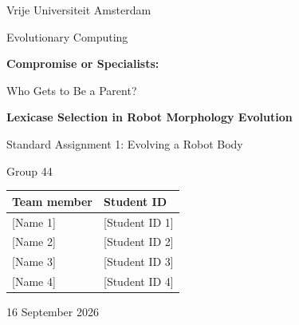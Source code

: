 \onecolumn
\thispagestyle{empty}
\begin{center}
\vspace*{1.0cm}
{\Large Vrije Universiteit Amsterdam\par}
\vspace{0.5cm}
{\large Evolutionary Computing\par}
\vspace{1.5cm}
{\LARGE\bfseries Compromise or Specialists:\par
Who Gets to Be a Parent?\par}
\vspace{0.4cm}
{\Large\bfseries Lexicase Selection in Robot Morphology Evolution\par}
\vspace{1.1cm}
{\large Standard Assignment 1: Evolving a Robot Body\par}
\vspace{0.6cm}
{\Large Group 44\par}
\vspace{0.9cm}
\begin{tabular}{ll}
\toprule
Team member & Student ID \\
\midrule
{[Name 1]} & {[Student ID 1]} \\
{[Name 2]} & {[Student ID 2]} \\
{[Name 3]} & {[Student ID 3]} \\
{[Name 4]} & {[Student ID 4]} \\
\bottomrule
\end{tabular}
\vfill
16 September 2026\par
\vspace*{0.6cm}
\end{center}
\clearpage
\twocolumn
\setcounter{page}{1}

